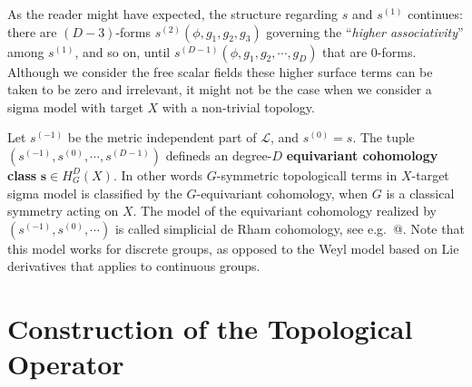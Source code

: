\documentclass[
  letterpaper,
  DIV=11,
  numbers=noendperiod]{scrreport}
\newcounter{quartocallouttipno}
\newcommand{\quartocallouttip}[1]{\refstepcounter{quartocallouttipno}\label{#1}}
\begin{document}
\begin{tcolorbox}[enhanced jigsaw, arc=.35mm, bottomrule=.15mm, toprule=.15mm, title=\textcolor{quarto-callout-tip-color}{\faLightbulb}\hspace{0.5em}{Tip \ref*{tip-equivariant}: equivariant cohomology}, colback=white, opacitybacktitle=0.6, rightrule=.15mm, opacityback=0, breakable, bottomtitle=1mm, titlerule=0mm, leftrule=.75mm, coltitle=black, colframe=quarto-callout-tip-color-frame, toptitle=1mm, left=2mm, colbacktitle=quarto-callout-tip-color!10!white]

\quartocallouttip{tip-equivariant} 

As the reader might have expected, the structure regarding \(s\) and
\(s^{(1)}\) continues: there are \((D-3)\)-forms
\(s^{(2)}(\phi,g_1,g_2,g_3)\) governing the ``\emph{higher
associativity}'' among \(s^{(1)}\), and so on, until
\(s^{(D-1)}(\phi,g_1,g_2,\cdots,g_{D})\) that are 0-forms. Although we
consider the free scalar fields these higher surface terms can be taken
to be zero and irrelevant, it might not be the case when we consider a
sigma model with target \(X\) with a non-trivial topology.

Let \(s^{(-1)}\) be the metric independent part of \(\mathcal{L}\), and
\(s^{(0)}=s\). The tuple \((s^{(-1)},s^{(0)},\cdots,s^{(D-1)})\)
defineds an degree-\(D\) \textbf{equivariant cohomology class}
\(\mathbf{s} \in H_G^D(X)\). In other words \(G\)-symmetric topologicall
terms in \(X\)-target sigma model is classified by the \(G\)-equivariant
cohomology, when \(G\) is a classical symmetry acting on \(X\). The
model\footnotemark{} of the equivariant cohomology realized by
\((s^{(-1)},s^{(0)},\cdots)\) is called simplicial de Rham cohomology,
see e.g.~@. Note that this model works for discrete groups, as opposed
to the Weyl model based on Lie derivatives that applies to continuous
groups.

\end{tcolorbox}


\section{Construction of the Topological
Operator}\label{construction-of-the-topological-operator}
\end{document}

